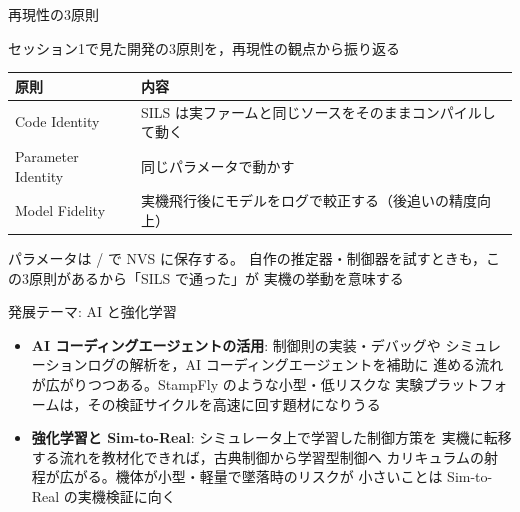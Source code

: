 \begin{frame}{再現性の3原則\later}
  \vspace{0.3em}

  {\small セッション1で見た開発の3原則を，再現性の観点から振り返る}

  \vspace{0.3em}

  \begin{table}
    \centering\footnotesize
    \begin{tabular}{lp{80mm}}
      \hline
      \textbf{原則} & \textbf{内容} \\
      \hline
      Code Identity & SILS は実ファームと同じソースをそのままコンパイルして動く \\
      Parameter Identity & 同じパラメータで動かす \\
      Model Fidelity & 実機飛行後にモデルをログで較正する（後追いの精度向上） \\
      \hline
    \end{tabular}
  \end{table}

  \vspace{0.5em}

  {\small パラメータは / で NVS に保存する。
  自作の推定器・制御器を試すときも，この3原則があるから「SILS で通った」が
  実機の挙動を意味する}
\end{frame}

\begin{frame}{発展テーマ: AI と強化学習\later}
  \begin{itemize}\small
    \item \textbf{AI コーディングエージェントの活用}: 制御則の実装・デバッグや
          シミュレーションログの解析を，AI コーディングエージェントを補助に
          進める流れが広がりつつある。StampFly のような小型・低リスクな
          実験プラットフォームは，その検証サイクルを高速に回す題材になりうる
    \item \textbf{強化学習と Sim-to-Real}: シミュレータ上で学習した制御方策を
          実機に転移する流れを教材化できれば，古典制御から学習型制御へ
          カリキュラムの射程が広がる。機体が小型・軽量で墜落時のリスクが
          小さいことは Sim-to-Real の実機検証に向く
  \end{itemize}
\end{frame}

